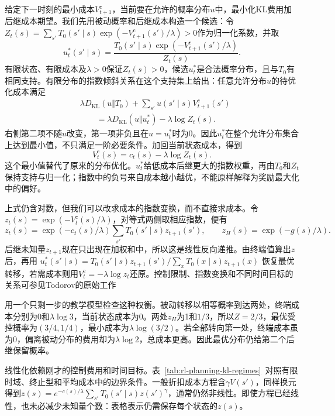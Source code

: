 给定下一时刻的最小成本$V_{t+1}^{\mathrm c}$，当前要在允许的概率分布$u$中，最小化KL费用加后继成本期望。我们先用被动概率和后继成本构造一个候选：令
$Z_t(s)=\sum_{s'}T_0(s'\mid s)\exp(-V_{t+1}^{\mathrm c}(s')/\lambda)>0$作为归一化系数，并取
\[
 u_t^*(s'\mid s)=
 \frac{T_0(s'\mid s)\exp(-V_{t+1}^{\mathrm c}(s')/\lambda)}{Z_t(s)}.
\]
有限状态、有限成本及$\lambda>0$保证$Z_t(s)>0$，候选$u_t^*$是合法概率分布，且与$T_0$有相同支持。有限分布的指数倾斜关系在这个支持集上给出：任意允许分布$u$的待优化成本满足
\begin{equation}
 \begin{aligned}
 &\lambda D_{\mathrm{KL}}(u\Vert T_0)
       +\sum_{s'}u(s'\mid s)V_{t+1}^{\mathrm c}(s')\\
 &\qquad=\lambda D_{\mathrm{KL}}(u\Vert u_t^*)-\lambda\log Z_t(s).
 \end{aligned}
 \label{eq:rl-planning-kl-completion}
\end{equation}
右侧第二项不随$u$改变，第一项非负且在$u=u_t^*$时为0。因此$u_t^*$在整个允许分布集合上达到最小值，不只满足一阶必要条件。加回当前状态成本，得到
\[
 V_t^{\mathrm c}(s)=c_t(s)-\lambda\log Z_t(s).
\]
这个最小值替代了原来的分布优化。$u_t^*$给低成本后继更大的指数权重，再由$T_0$和$Z_t$保持支持与归一化；指数中的负号来自成本越小越优，不能原样解释为奖励最大化中的偏好。

上式仍含对数，但我们可以改求成本的指数变换，而不直接求成本。令$z_t(s)=\exp(-V_t^{\mathrm c}(s)/\lambda)$，对等式两侧取相应指数，便有
\begin{equation}
 z_t(s)=\exp(-c_t(s)/\lambda)\sum_{s'}T_0(s'\mid s)z_{t+1}(s'),
 \qquad z_H(s)=\exp(-g(s)/\lambda).
 \label{eq:rl-planning-kl-linear}
\end{equation}
后继未知量$z_{t+1}$现在只出现在加权和中，所以这是线性反向递推。由终端值算出$z$后，再用
$u_t^*(s'\mid s)=T_0(s'\mid s)z_{t+1}(s')/\sum_xT_0(x\mid s)z_{t+1}(x)$
恢复最优转移，若需成本则用$V_t^{\mathrm c}=-\lambda\log z_t$还原。控制限制、指数变换和不同时间目标的关系可参见Todorov的原始工作

用一个只剩一步的教学模型检查这种权衡。被动转移以相等概率到达两处，终端成本分别为0和$\lambda\log3$，当前状态成本为0。两处$z_H$为1和$1/3$，所以$Z=2/3$，最优受控概率为$(3/4,1/4)$，最小成本为$\lambda\log(3/2)$。若全部转向第一处，终端成本虽为0，偏离被动分布的费用却为$\lambda\log2$，总成本更高。因此最优分布仍给第二个后继保留概率。

线性化依赖刚才的控制费用和时间目标。表~\ref{tab:rl-planning-kl-regimes}~对照有限时域、终止型和平均成本中的边界条件。一般折扣成本方程含$\gamma V(s')$，同样换元得到$z(s)=e^{-c(s)/\lambda}\sum_{s'}T_0(s'\mid s)z(s')^\gamma$，通常仍然非线性。即使方程已经线性，也未必减少未知量个数：表格表示仍需保存每个状态的$z(s)$。

